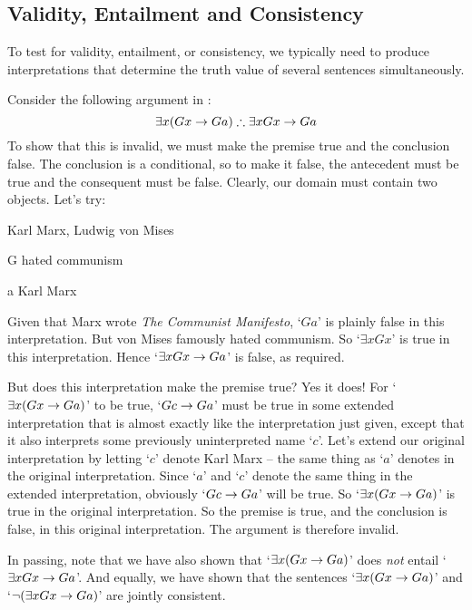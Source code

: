 \begin{earg}
\section{Validity, Entailment and Consistency}
To test for validity, entailment, or consistency, we typically need to produce interpretations that determine the truth value of several sentences simultaneously. 

Consider the following argument in \FOL:
$$\exists x(Gx \rightarrow Ga) \mathrel{\therefore} \exists x Gx \rightarrow Ga$$
To show that this is invalid, we must make the premise true and the conclusion false. The conclusion is a conditional, so to make it false, the antecedent must be true and the consequent must be false. Clearly, our domain must contain two objects. Let's try:
	\begin{ekey}
		\item[\domain] Karl Marx, Ludwig von Mises
		\item[G]  hated communism
		\item[a] Karl Marx
	\end{ekey}
Given that Marx wrote \emph{The Communist Manifesto}, `$Ga$' is plainly false in this interpretation. But von Mises famously hated communism. So `$\exists x Gx$' is true in this interpretation. Hence `$\exists x Gx \rightarrow Ga$' is false, as required. 

But does this interpretation make the premise true? Yes it does! For `$\exists x (Gx \rightarrow Ga)$' to be true,  `$Gc \rightarrow Ga$' must be true in  some extended interpretation that is almost exactly like the interpretation just given, except that it also interprets some previously uninterpreted name `$c$'. Let's extend our original interpretation by letting `$c$' denote Karl Marx – the same thing as `$a$' denotes in the original interpretation. Since `$a$' and `$c$' denote the same thing in the extended interpretation, obviously `$Gc \rightarrow Ga$' will be true. So `$\exists x (Gx \rightarrow Ga)$' is true in the original interpretation. So the premise is true, and the conclusion is false, in this original interpretation. The argument is therefore invalid. 

In passing, note that we have also shown that `$\exists x(Gx \rightarrow Ga)$' does \emph{not} entail `$\exists x Gx \rightarrow Ga$'. And equally, we have shown that the sentences `$\exists x (Gx \rightarrow Ga)$' and `$\neg (\exists x Gx \rightarrow Ga)$' are jointly consistent.


\end{earg}
